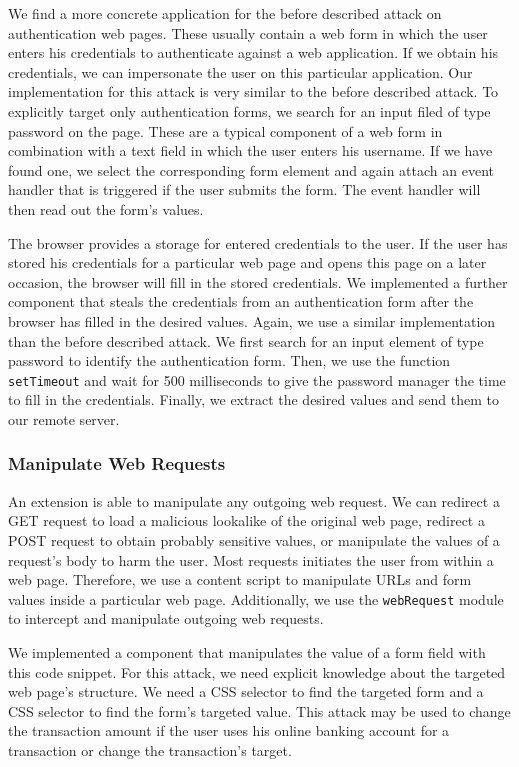 	We find a more concrete application for the before described attack on authentication web pages. These usually contain a web form in which the user enters his credentials to authenticate against a web application. If we obtain his credentials, we can impersonate the user on this particular application. Our implementation for this attack is very similar to the before described attack. To explicitly target only authentication forms, we search for an input filed of type password on the page. These are a typical component of a web form in combination with a text field in which the user enters his username. If we have found one, we select the corresponding form element and again attach an event handler that is triggered if the user submits the form. The event handler will then read out the form's values.

	The browser provides a storage for entered credentials to the user. If the user has stored his credentials for a particular web page and opens this page on a later occasion, the browser will fill in the stored credentials. We implemented a further component that steals the credentials from an authentication form after the browser has filled in the desired values. Again, we use a similar implementation than the before described attack. We first search for an input element of type password to identify the authentication form. Then, we use the function \texttt{setTimeout} and wait for 500 milliseconds to give the password manager the time to fill in the credentials. Finally, we extract the desired values and send them to our remote server.
		
\subsubsection{Manipulate Web Requests}
\label{sec:manipulateWebRequests}

	An extension is able to manipulate any outgoing web request. We can redirect a GET request to load a malicious lookalike of the original web page, redirect a POST request to obtain probably sensitive values, or manipulate the values of a request's body to harm the user. Most requests initiates the user from within a web page. Therefore, we use a content script to manipulate URLs and form values inside a particular web page. Additionally, we use the \texttt{webRequest} module to intercept and manipulate outgoing web requests.
	
	We implemented a component that manipulates the value of a form field with this code snippet. For this attack, we need explicit knowledge about the targeted web page's structure. We need a CSS selector to find the targeted form and a CSS selector to find the form's targeted value. This attack may be used to change the transaction amount if the user uses his online banking account for a transaction or change the transaction's target. 

